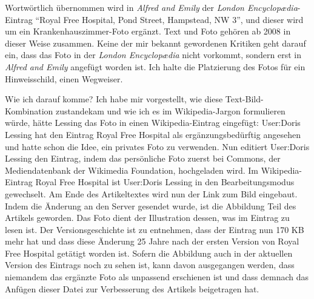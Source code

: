 \documentclass[fontsize=12pt]{scrartcl}
\begin{document}
Wortw\"ortlich \"ubernommen wird in \textit{Alfred and Emily} der \textit{London Encyclop{\ae}dia}-Eintrag "`Royal Free Hospital, Pond Street, Hampstead, NW 3"', und dieser wird um ein Krankenhauszimmer-Foto erg\"anzt. Text und Foto geh\"oren ab 2008 in dieser Weise zusammen. Keine der mir bekannt gewordenen Kritiken geht darauf ein, dass das Foto in der \textit{London Encyclop{\ae}dia} nicht vorkommt, sondern erst in \textit{Alfred and Emily} angef\"ugt worden ist. Ich halte die Platzierung des Fotos f\"ur ein Hinweisschild, einen Wegweiser. 

Wie ich darauf komme? Ich habe mir vorgestellt, wie diese Text-Bild-Kombination zustandekam und wie ich es im Wi\-ki\-pe\-dia-Jargon formulieren w\"urde, h\"atte Lessing das Foto in einen Wi\-ki\-pe\-dia-Eintrag eingef\"ugt: \mbox{User}:Doris Lessing hat den Eintrag \flq Royal Free Hospital\frq \,\,als er\-g\"an\-zungs\-be\-d\"urf\-tig angesehen und hatte schon die Idee, ein privates Foto zu verwenden. Nun editiert \mbox{User}:Doris Lessing den Eintrag, indem das per\-s\"onli\-che Foto zuerst \flq bei Commons\frq, der Mediendatenbank der Wikimedia Foundation, hochgeladen wird. Im Wi\-ki\-pe\-dia-Eintrag \flq Royal Free Hospital\frq \,\,ist \mbox{User}:Doris Lessing in den Bearbeitungsmodus gewechselt. Am Ende des Artikeltextes wird nun der Link zum Bild eingebaut. Indem die \"Anderung an den Server gesendet wurde, ist die Abbildung Teil des Artikels geworden. Das Foto dient der Illustration dessen, was im Eintrag zu lesen ist. Der Versionsgeschichte ist zu entnehmen, dass der Eintrag nun 170 KB mehr hat und dass diese \"Anderung 25 Jahre nach der ersten Version von \flq Royal Free Hospital\frq \,\,get\"atigt worden ist. Sofern die Abbildung auch in der aktuellen Version des Eintrags noch zu sehen ist, kann davon ausgegangen werden, dass niemandem das erg\"anzte Foto als unpassend erschienen ist und dass demnach das Anf\"ugen dieser Datei zur Verbesserung des Artikels beigetragen hat. 
\end{document}
